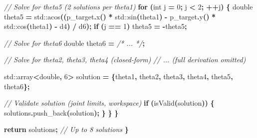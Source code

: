\documentclass[
]{article}
\newenvironment{Shaded}{\begin{snugshade}}{\end{snugshade}}
\newcommand{\BuiltInTok}[1]{#1}
\newcommand{\CommentTok}[1]{\textcolor[rgb]{0.56,0.35,0.01}{\textit{#1}}}
\newcommand{\ControlFlowTok}[1]{\textcolor[rgb]{0.13,0.29,0.53}{\textbf{#1}}}
\newcommand{\DataTypeTok}[1]{\textcolor[rgb]{0.13,0.29,0.53}{#1}}
\newcommand{\DecValTok}[1]{\textcolor[rgb]{0.00,0.00,0.81}{#1}}
\newcommand{\NormalTok}[1]{#1}
\newcommand{\OperatorTok}[1]{\textcolor[rgb]{0.81,0.36,0.00}{\textbf{#1}}}
\begin{document}
\begin{Shaded}
\begin{Highlighting}[]
            \CommentTok{// Solve for theta5 (2 solutions per theta1)}
            \ControlFlowTok{for} \OperatorTok{(}\DataTypeTok{int}\NormalTok{ j }\OperatorTok{=} \DecValTok{0}\OperatorTok{;}\NormalTok{ j }\OperatorTok{\textless{}} \DecValTok{2}\OperatorTok{;} \OperatorTok{++}\NormalTok{j}\OperatorTok{)} \OperatorTok{\{}
                \DataTypeTok{double}\NormalTok{ theta5 }\OperatorTok{=} \BuiltInTok{std::}\NormalTok{acos}\OperatorTok{((}\NormalTok{p\_target}\OperatorTok{.}\NormalTok{x}\OperatorTok{()} \OperatorTok{*} \BuiltInTok{std::}\NormalTok{sin}\OperatorTok{(}\NormalTok{theta1}\OperatorTok{)} \OperatorTok{{-}}
\NormalTok{                                          p\_target}\OperatorTok{.}\NormalTok{y}\OperatorTok{()} \OperatorTok{*} \BuiltInTok{std::}\NormalTok{cos}\OperatorTok{(}\NormalTok{theta1}\OperatorTok{)} \OperatorTok{{-}}\NormalTok{ d4}\OperatorTok{)} \OperatorTok{/}\NormalTok{ d6}\OperatorTok{);}
                \ControlFlowTok{if} \OperatorTok{(}\NormalTok{j }\OperatorTok{==} \DecValTok{1}\OperatorTok{)}\NormalTok{ theta5 }\OperatorTok{=} \OperatorTok{{-}}\NormalTok{theta5}\OperatorTok{;}

                \CommentTok{// Solve for theta6}
                \DataTypeTok{double}\NormalTok{ theta6 }\OperatorTok{=} \CommentTok{/* ... */}\OperatorTok{;}

                \CommentTok{// Solve for theta2, theta3, theta4 (closed{-}form)}
                \CommentTok{// ... (full derivation omitted)}

                \BuiltInTok{std::}\NormalTok{array}\OperatorTok{\textless{}}\DataTypeTok{double}\OperatorTok{,} \DecValTok{6}\OperatorTok{\textgreater{}}\NormalTok{ solution }\OperatorTok{=} \OperatorTok{\{}\NormalTok{theta1}\OperatorTok{,}\NormalTok{ theta2}\OperatorTok{,}\NormalTok{ theta3}\OperatorTok{,}\NormalTok{ theta4}\OperatorTok{,}\NormalTok{ theta5}\OperatorTok{,}\NormalTok{ theta6}\OperatorTok{\};}

                \CommentTok{// Validate solution (joint limits, workspace)}
                \ControlFlowTok{if} \OperatorTok{(}\NormalTok{isValid}\OperatorTok{(}\NormalTok{solution}\OperatorTok{))} \OperatorTok{\{}
\NormalTok{                    solutions}\OperatorTok{.}\NormalTok{push\_back}\OperatorTok{(}\NormalTok{solution}\OperatorTok{);}
                \OperatorTok{\}}
            \OperatorTok{\}}
        \OperatorTok{\}}

        \ControlFlowTok{return}\NormalTok{ solutions}\OperatorTok{;}  \CommentTok{// Up to 8 solutions}
    \OperatorTok{\}}


\end{Highlighting}
\end{Shaded}
\end{document}
